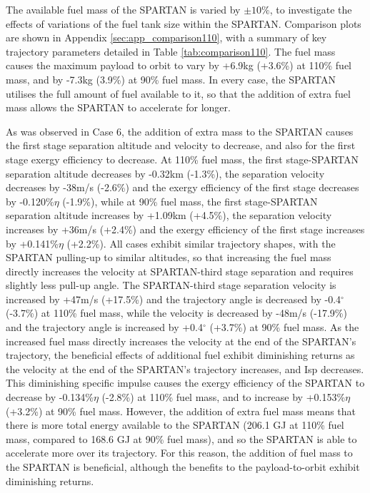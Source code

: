 The available fuel mass of the SPARTAN is varied by $\pm 10\%$, to investigate the effects of variations of the fuel tank size within the SPARTAN. Comparison plots are shown in Appendix \ref{sec:app_comparison110}, with a summary of key trajectory parameters detailed in Table \ref{tab:comparison110}.
The fuel mass causes the maximum payload to orbit to vary by +6.9kg (+3.6\%) at 110\% fuel mass, and by -7.3kg (3.9\%) at 90\% fuel mass. 
 In every case, the SPARTAN utilises the full amount of fuel available to it, so that the addition of extra fuel mass allows the SPARTAN to accelerate for longer. 

 As was observed in Case 6, the addition of extra mass to the SPARTAN causes the first stage separation altitude and velocity to decrease, and also for the first stage exergy efficiency to decrease. At 110\% fuel mass, the first stage-SPARTAN separation altitude decreases by -0.32km (-1.3\%), the separation velocity decreases by -38m/s (-2.6\%) and the exergy efficiency of the first stage decreases by -0.120\%$\eta$ (-1.9\%), while at 90\% fuel mass, the first stage-SPARTAN separation altitude increases by +1.09km (+4.5\%), the separation velocity increases by +36m/s (+2.4\%) and the exergy efficiency of the first stage increases by +0.141\%$\eta$ (+2.2\%).
All cases exhibit similar trajectory shapes, with the SPARTAN pulling-up to similar altitudes, so that increasing the fuel mass directly increases the velocity at SPARTAN-third stage separation and requires slightly less pull-up angle. The SPARTAN-third stage separation velocity is increased by +47m/s (+17.5\%) and the trajectory angle is decreased by -0.4$^\circ$ (-3.7\%) at 110\% fuel mass, while the velocity is decreased by -48m/s (-17.9\%) and the trajectory angle is increased by +0.4$^\circ$ (+3.7\%) at 90\% fuel mass. 
As the increased fuel mass directly increases the velocity at the end of the SPARTAN's trajectory, the beneficial effects of additional fuel exhibit diminishing returns as the velocity at the end of the SPARTAN's trajectory increases, and Isp decreases.
This diminishing specific impulse causes the exergy efficiency of the SPARTAN to decrease by -0.134\%$\eta$ (-2.8\%) at 110\% fuel mass, and to increase by +0.153\%$\eta$ (+3.2\%) at 90\% fuel mass. 
However, the addition of extra fuel mass means that there is more total energy available to the SPARTAN (206.1 GJ at 110\% fuel mass, compared to 168.6 GJ at 90\% fuel mass), and so the SPARTAN is able to accelerate more over its trajectory. For this reason, the addition of fuel mass to the SPARTAN is beneficial, although the benefits to the payload-to-orbit exhibit diminishing returns. 

